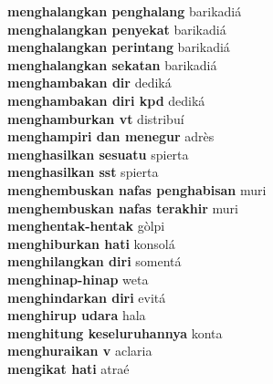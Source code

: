 \textbf{ menghalangkan penghalang  } barikadiá \\
\textbf{ menghalangkan penyekat  } barikadiá \\
\textbf{ menghalangkan perintang  } barikadiá \\
\textbf{ menghalangkan sekatan  } barikadiá \\
\textbf{ menghambakan dir  } dediká \\
\textbf{ menghambakan diri kpd  } dediká \\
\textbf{ menghamburkan vt  } distribuí \\
\textbf{ menghampiri dan menegur  } adrès \\
\textbf{ menghasilkan sesuatu  } spierta \\
\textbf{ menghasilkan sst  } spierta \\
\textbf{ menghembuskan nafas penghabisan  } muri \\
\textbf{ menghembuskan nafas terakhir  } muri \\
\textbf{ menghentak-hentak  } gòlpi \\
\textbf{ menghiburkan hati  } konsolá \\
\textbf{ menghilangkan diri  } somentá \\
\textbf{ menghinap-hinap  } weta \\
\textbf{ menghindarkan diri  } evitá \\
\textbf{ menghirup udara  } hala \\
\textbf{ menghitung keseluruhannya  } konta \\
\textbf{ menghuraikan v  } aclaria \\
\textbf{ mengikat hati  } atraé \\
